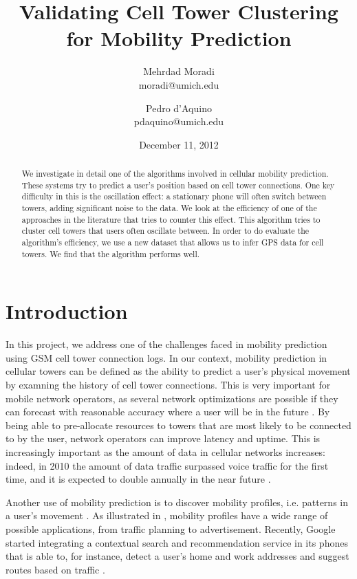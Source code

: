 \documentclass[letterpaper, 11pt, conference]{ieeeconf}
\begin{document}
\title{Validating Cell Tower Clustering for Mobility Prediction}
\author{Mehrdad Moradi\\moradi@umich.edu \and Pedro d'Aquino\\pdaquino@umich.edu}
\date{December 11, 2012}

\maketitle

\begin{abstract}
We investigate in detail one of the algorithms involved in cellular mobility prediction. These systems try to predict a user's position based on cell tower connections. One key difficulty in this is the oscillation effect: a stationary phone will often switch between towers, adding significant noise to the data. We look at the efficiency of one of the approaches in the literature that tries to counter this effect.  This algorithm tries to cluster cell towers that users often oscillate between. In order to do evaluate the algorithm's efficiency, we use a new dataset that allows us to infer GPS data for cell towers. We find that the algorithm performs well.
\end{abstract}

\section{Introduction}
\label{sec:intro}

In this project, we address one of the challenges faced in mobility prediction using GSM cell tower connection logs. In our context, mobility prediction in cellular
towers can be defined as the ability to predict a user's physical movement by examning the history of cell tower connections. This is very important
for mobile network operators, as several network optimizations are possible if they can forecast with reasonable accuracy
where a user will be in the future \cite{LeapGraph} \cite{Liu97anoptimal}. By being able to pre-allocate resources to towers that are most likely to
be connected to by the user, network operators can improve latency and uptime. This is increasingly important as the amount of data in cellular networks
increases: indeed, in 2010 the amount of data traffic surpassed voice traffic for the first time, and it is expected to double annually in the near future
\cite{EricssonData}.

Another use of mobility prediction is to discover mobility profiles, i.e. patterns in a user's movement \cite{mobilityprofiler}. As illustrated in \cite{mobilityprofiler}, mobility profiles have a wide range of possible applications, from traffic planning to advertisement. Recently, Google started integrating
a contextual search and recommendation service in its phones that is able to, for instance, detect a user's home and work addresses and suggest routes based on
traffic \cite{googleNow}.
\end{document}
